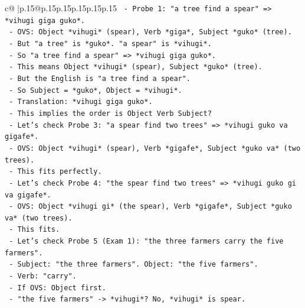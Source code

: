 \documentclass{article}
\begin{document}
{\begin{supertabular}{c@{$\;$}|p{.15\linewidth}@{}p{.15\linewidth}p{.15\linewidth}p{.15\linewidth}p{.15\linewidth}p{.15\linewidth}}
{{{\texttt{                            {-} Probe 1: "a tree find a spear" => *vihugi giga guko*.} \\
\texttt{                              {-} OVS: Object *vihugi* (spear), Verb *giga*, Subject *guko* (tree).} \\
\texttt{                              {-} But "a tree" is *guko*. "a spear" is *vihugi*.} \\
\texttt{                              {-} So "a tree find a spear" => *vihugi giga guko*.} \\
\texttt{                              {-} This means Object *vihugi* (spear), Subject *guko* (tree).} \\
\texttt{                              {-} But the English is "a tree find a spear".} \\
\texttt{                              {-} So Subject = *guko*, Object = *vihugi*.} \\
\texttt{                              {-} Translation: *vihugi giga guko*.} \\
\texttt{                              {-} This implies the order is Object Verb Subject?} \\
\texttt{                              {-} Let's check Probe 3: "a spear find two trees" => *vihugi guko va gigafe*.} \\
\texttt{                              {-} OVS: Object *vihugi* (spear), Verb *gigafe*, Subject *guko va* (two trees).} \\
\texttt{                              {-} This fits perfectly.} \\
\texttt{                              {-} Let's check Probe 4: "the spear find two trees" => *vihugi guko gi va gigafe*.} \\
\texttt{                              {-} OVS: Object *vihugi gi* (the spear), Verb *gigafe*, Subject *guko va* (two trees).} \\
\texttt{                              {-} This fits.} \\
\texttt{                              {-} Let's check Probe 5 (Exam 1): "the three farmers carry the five farmers".} \\
\texttt{                                {-} Subject: "the three farmers". Object: "the five farmers".} \\
\texttt{                                {-} Verb: "carry".} \\
\texttt{                                {-} If OVS: Object first.} \\
\texttt{                                {-} "the five farmers" {-}> *vihugi*? No, *vihugi* is spear.} \\
}}}
\end{supertabular}}
\end{document}
